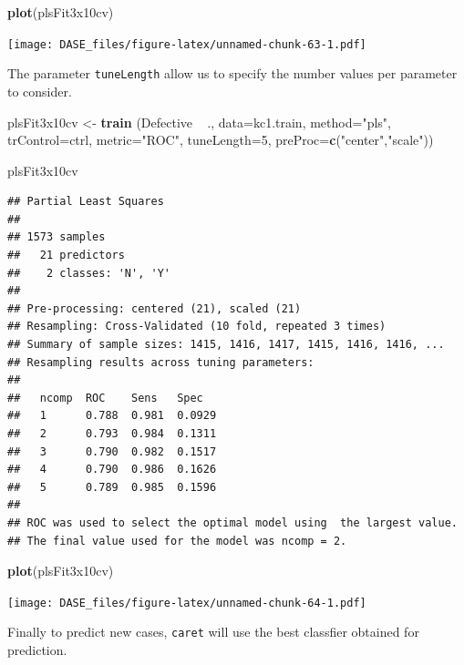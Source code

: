 \documentclass[]{book}
\newenvironment{Shaded}{\begin{snugshade}}{\end{snugshade}}
\newcommand{\KeywordTok}[1]{\textcolor[rgb]{0.13,0.29,0.53}{\textbf{{#1}}}}
\newcommand{\DataTypeTok}[1]{\textcolor[rgb]{0.13,0.29,0.53}{{#1}}}
\newcommand{\DecValTok}[1]{\textcolor[rgb]{0.00,0.00,0.81}{{#1}}}
\newcommand{\StringTok}[1]{\textcolor[rgb]{0.31,0.60,0.02}{{#1}}}
\newcommand{\NormalTok}[1]{{#1}}
\begin{document}
\begin{Shaded}
\begin{Highlighting}[]
\KeywordTok{plot}\NormalTok{(plsFit3x10cv)}
\end{Highlighting}
\end{Shaded}

\texttt{[image: DASE\_files/figure-latex/unnamed-chunk-63-1.pdf]}

The parameter \texttt{tuneLength} allow us to specify the number values
per parameter to consider.

\begin{Shaded}
\begin{Highlighting}[]
\NormalTok{plsFit3x10cv <-}\StringTok{ }\KeywordTok{train} \NormalTok{(Defective ~}\StringTok{ }\NormalTok{., }\DataTypeTok{data=}\NormalTok{kc1.train, }\DataTypeTok{method=}\StringTok{"pls"}\NormalTok{, }\DataTypeTok{trControl=}\NormalTok{ctrl, }\DataTypeTok{metric=}\StringTok{"ROC"}\NormalTok{, }\DataTypeTok{tuneLength=}\DecValTok{5}\NormalTok{, }\DataTypeTok{preProc=}\KeywordTok{c}\NormalTok{(}\StringTok{"center"}\NormalTok{,}\StringTok{"scale"}\NormalTok{))}

\NormalTok{plsFit3x10cv}
\end{Highlighting}
\end{Shaded}

\begin{verbatim}
## Partial Least Squares 
## 
## 1573 samples
##   21 predictors
##    2 classes: 'N', 'Y' 
## 
## Pre-processing: centered (21), scaled (21) 
## Resampling: Cross-Validated (10 fold, repeated 3 times) 
## Summary of sample sizes: 1415, 1416, 1417, 1415, 1416, 1416, ... 
## Resampling results across tuning parameters:
## 
##   ncomp  ROC    Sens   Spec  
##   1      0.788  0.981  0.0929
##   2      0.793  0.984  0.1311
##   3      0.790  0.982  0.1517
##   4      0.790  0.986  0.1626
##   5      0.789  0.985  0.1596
## 
## ROC was used to select the optimal model using  the largest value.
## The final value used for the model was ncomp = 2.
\end{verbatim}

\begin{Shaded}
\begin{Highlighting}[]
\KeywordTok{plot}\NormalTok{(plsFit3x10cv)}
\end{Highlighting}
\end{Shaded}

\texttt{[image: DASE\_files/figure-latex/unnamed-chunk-64-1.pdf]}

Finally to predict new cases, \texttt{caret} will use the best classfier
obtained for prediction.
\end{document}
